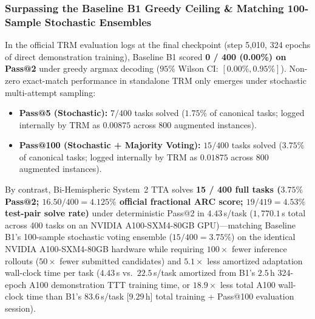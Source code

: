 \documentclass[11pt,a4paper]{article}
\theoremstyle{plain}
\theoremstyle{definition}
\theoremstyle{remark}
\begin{document}
\subsubsection{Surpassing the Baseline B1 Greedy Ceiling \& Matching 100-Sample Stochastic Ensembles}
In the official TRM evaluation logs at the final checkpoint (step 5,010, 324 epochs of direct demonstration training), Baseline B1 scored \textbf{0 / 400 (0.00\%) on Pass@2} under greedy argmax decoding ($95\%$ Wilson CI: $[0.00\%, 0.95\%]$). Non-zero exact-match performance in standalone TRM only emerges under stochastic multi-attempt sampling:
\begin{itemize}
    \item \textbf{Pass@5 (Stochastic):} $7 / 400$ tasks solved (\textbf{$1.75\%$} of canonical tasks; logged internally by TRM as $0.00875$ across $800$ augmented instances).
    \item \textbf{Pass@100 (Stochastic + Majority Voting):} $15 / 400$ tasks solved (\textbf{$3.75\%$} of canonical tasks; logged internally by TRM as $0.01875$ across $800$ augmented instances).
\end{itemize}
By contrast, Bi-Hemispheric System~2 TTA solves \textbf{15 / 400 full tasks ($3.75\%$ Pass@2; $16.50 / 400 = 4.125\%$ official fractional ARC score; $19 / 419 = 4.53\%$ test-pair solve rate)} under deterministic Pass@2 in $4.43$\,s/task ($1{,}770.1$\,s total across 400 tasks on an NVIDIA A100-SXM4-80GB GPU)---matching Baseline B1's 100-sample stochastic voting ensemble ($15 / 400 = 3.75\%$) on the identical NVIDIA A100-SXM4-80GB hardware while requiring $100\times$ fewer inference rollouts ($50\times$ fewer submitted candidates) and $5.1\times$ less amortized adaptation wall-clock time per task ($4.43$\,s vs.\ $22.5$\,s/task amortized from B1's $2.5$\,h 324-epoch A100 demonstration TTT training time, or $18.9\times$ less total A100 wall-clock time than B1's $83.6$\,s/task [$9.29$\,h] total training + Pass@100 evaluation session).
\end{document}
